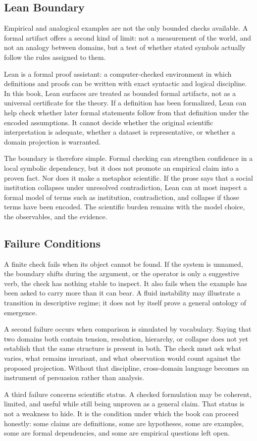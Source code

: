 \documentclass[11pt,a4paper,openany]{book}
\begin{document}
\subsection{Lean Boundary}
Empirical and analogical examples are not the only bounded checks available. A formal artifact offers a second kind of limit: not a measurement of the world, and not an analogy between domains, but a test of whether stated symbols actually follow the rules assigned to them. \cite{kadanoff_scaling,wilson_renormalization}\par
Lean is a formal proof assistant: a computer-checked environment in which definitions and proofs can be written with exact syntactic and logical discipline. In this book, Lean surfaces are treated as bounded formal artifacts, not as a universal certificate for the theory. If a definition has been formalized, Lean can help check whether later formal statements follow from that definition under the encoded assumptions. It cannot decide whether the original scientific interpretation is adequate, whether a dataset is representative, or whether a domain projection is warranted.\par
The boundary is therefore simple. Formal checking can strengthen confidence in a local symbolic dependency, but it does not promote an empirical claim into a proven fact. Nor does it make a metaphor scientific. If the prose says that a social institution collapses under unresolved contradiction, Lean can at most inspect a formal model of terms such as institution, contradiction, and collapse if those terms have been encoded. The scientific burden remains with the model choice, the observables, and the evidence.\par
\subsection{Failure Conditions}
A finite check fails when its object cannot be found. If the system is unnamed, the boundary shifts during the argument, or the operator is only a suggestive verb, the check has nothing stable to inspect. It also fails when the example has been asked to carry more than it can bear. A fluid instability may illustrate a transition in descriptive regime; it does not by itself prove a general ontology of emergence. \cite{kadanoff_scaling,wilson_renormalization}\par
A second failure occurs when comparison is simulated by vocabulary. Saying that two domains both contain tension, resolution, hierarchy, or collapse does not yet establish that the same structure is present in both. The check must ask what varies, what remains invariant, and what observation would count against the proposed projection. Without that discipline, cross-domain language becomes an instrument of persuasion rather than analysis.\par
A third failure concerns scientific status. A checked formulation may be coherent, limited, and useful while still being unproven as a general claim. That status is not a weakness to hide. It is the condition under which the book can proceed honestly: some claims are definitions, some are hypotheses, some are examples, some are formal dependencies, and some are empirical questions left open.\par
\end{document}
